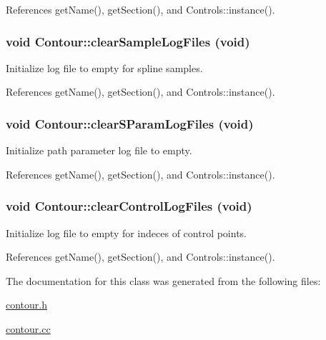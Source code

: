 References getName(), getSection(), and Controls::instance().\hypertarget{classContour_c68248cf6e54b4baf426bf5a47f5b894}{
\subsubsection[clearSampleLogFiles]{\setlength{\rightskip}{0pt plus 5cm}void Contour::clearSampleLogFiles (void)}}
\label{classContour_c68248cf6e54b4baf426bf5a47f5b894}


Initialize log file to empty for spline samples. 

References getName(), getSection(), and Controls::instance().\hypertarget{classContour_07f79c4a923c8589f8b201151bde2202}{
\subsubsection[clearSParamLogFiles]{\setlength{\rightskip}{0pt plus 5cm}void Contour::clearSParamLogFiles (void)}}
\label{classContour_07f79c4a923c8589f8b201151bde2202}


Initialize path parameter log file to empty. 

References getName(), getSection(), and Controls::instance().\hypertarget{classContour_bc87646ea6d6df9b49001597f57af4e7}{
\subsubsection[clearControlLogFiles]{\setlength{\rightskip}{0pt plus 5cm}void Contour::clearControlLogFiles (void)}}
\label{classContour_bc87646ea6d6df9b49001597f57af4e7}


Initialize log file to empty for indeces of control points. 

References getName(), getSection(), and Controls::instance().

The documentation for this class was generated from the following files:\begin{CompactItemize}
\item 
\hyperlink{contour_8h}{contour.h}\item 
\hyperlink{contour_8cc}{contour.cc}\end{CompactItemize}
